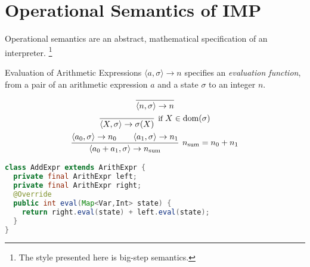 \section{Operational Semantics of IMP}

\begin{frame}
  Operational semantics are an abstract, mathematical specification of an interpreter.
  \footnote{The style presented here is big-step semantics.}
\end{frame}

\begin{frame}[fragile]{Evaluation of Arithmetic Expressions}
    $\langle a, \sigma \rangle \rightarrow n$ specifies an \emph{evaluation function}, from
    a pair of an arithmetic expression $a$ and a state $\sigma$ to an integer $n$.\\
    \begin{overprint}
        \begin{gather*}
            \infer{\langle n , \sigma \rangle \rightarrow n}{} \\
            \infer[\text{\small if } X \in \mathrm{dom}(\sigma)]{\langle X , \sigma \rangle \rightarrow \sigma(X)}{} \\
            \infer[n_\mathrm{sum} = n_0 + n_1]{\langle a_0 + a_1 , \sigma \rangle \rightarrow n_\mathrm{sum}}{\langle a_0 , \sigma \rangle \rightarrow n_0 \qquad \langle a_1 , \sigma \rangle \rightarrow n_1}
        \end{gather*}
        \begin{alertenv}
        \begin{itemize}
        \end{itemize}
        \end{alertenv}
        \begin{lstlisting}[language=java, basicstyle=\small]
class AddExpr extends ArithExpr {
  private final ArithExpr left;
  private final ArithExpr right;
  @Override
  public int eval(Map<Var,Int> state) {
    return right.eval(state) + left.eval(state);
  }
}
        \end{lstlisting}
    \end{overprint}
\end{frame}

